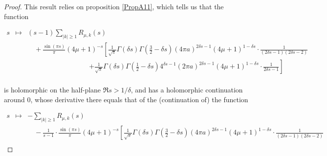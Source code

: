 \documentclass{jams-l}
\theoremstyle{definition}
\theoremstyle{remark}
\numberwithin{equation}{section}
\begin{document}
            \begin{proof}
            
                This result relies on proposition \ref{PropA11}, which tells us that the function
                
                \[ \begin{array}{lll}
                        \scriptstyle s & \scriptstyle \longmapsto & \scriptstyle \left( s - 1 \right) \sum\limits_{\left \vert k \right \vert \geqslant 1} R_{\mu,k} \left( s \right) \\[1em]
                        
                        && \scriptstyle \quad + \frac{\sin \left( \pi s \right)}{\pi} \left( 4 \mu + 1 \right)^{-s} \left[ \frac{1}{\sqrt{\pi}} \Gamma \left( \delta s \right) \Gamma \left( \frac{3}{2} - \delta s \right) \left( 4 \pi a \right)^{2 \delta s - 1} \left( 4 \mu + 1 \right)^{1 - \delta s} \cdot \frac{1}{\left( 2 \delta s - 1 \right) \left( 2 \delta s - 2 \right)} \right. \\[1em]
                        
                        && \scriptstyle \qquad \qquad \qquad \qquad \quad \left. + \frac{1}{\sqrt{\pi}} \Gamma \left( \delta s \right) \Gamma \left( \frac{1}{2} - \delta s \right) 4^{\delta s - 1} \left( 2 \pi a \right)^{2 \delta s - 1} \left( 4 \mu + 1 \right)^{1 - \delta s} \cdot \frac{1}{2 \delta s - 1} \right] \\[1em]
                    \end{array} \]
                
                \noindent is holomorphic on the half-plane $\Re s > 1/\delta$, and has a holomorphic continuation around $0$, whose derivative there equals that of the (continuation of) the function 
                
                \[ \begin{array}{lll}
                        \scriptstyle s & \scriptstyle \longmapsto & \scriptstyle - \sum\limits_{\left \vert k \right \vert \geqslant 1} R_{\mu,k} \left( s \right) \\[1em]
                        
                        && \scriptstyle \quad - \frac{1}{s-1} \cdot \frac{\sin \left( \pi s \right)}{\pi} \left( 4 \mu + 1 \right)^{-s} \left[ \frac{1}{\sqrt{\pi}} \Gamma \left( \delta s \right) \Gamma \left( \frac{3}{2} - \delta s \right) \left( 4 \pi a \right)^{2 \delta s - 1} \left( 4 \mu + 1 \right)^{1 - \delta s} \cdot \frac{1}{\left( 2 \delta s - 1 \right) \left( 2 \delta s - 2 \right)} \right. \\[1em]
                        

\end{array}\]
\end{proof}
\end{document}
